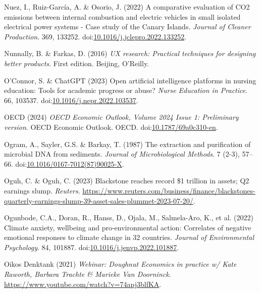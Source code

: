 \documentclass[
  letterpaper,
  DIV=11,
  numbers=noendperiod]{scrartcl}
\newlength{\cslhangindent}
\newenvironment{CSLReferences}[2] %
 {\begin{list}{}{%
  \setlength{\itemindent}{0pt}
  \setlength{\leftmargin}{0pt}
  \setlength{\parsep}{0pt}
  \ifodd #1
   \setlength{\leftmargin}{\cslhangindent}
   \setlength{\itemindent}{-1\cslhangindent}
  \fi
  \setlength{\itemsep}{#2\baselineskip}}}
 {\end{list}}
\begin{document}
\begin{CSLReferences}{0}{1}
Nuez, I., Ruiz-García, A. \& Osorio, J. (2022) A comparative evaluation
of {CO2} emissions between internal combustion and electric vehicles in
small isolated electrical power systems - {Case} study of the {Canary
Islands}. \emph{Journal of Cleaner Production}. 369, 133252.
doi:\href{https://doi.org/10.1016/j.jclepro.2022.133252}{10.1016/j.jclepro.2022.133252}.

Nunnally, B. \& Farkas, D. (2016) \emph{{UX} research: Practical
techniques for designing better products}. First edition. Beijing,
O'Reilly.

O'Connor, S. \& ChatGPT (2023) Open artificial intelligence platforms in
nursing education: {Tools} for academic progress or abuse? \emph{Nurse
Education in Practice}. 66, 103537.
doi:\href{https://doi.org/10.1016/j.nepr.2022.103537}{10.1016/j.nepr.2022.103537}.

OECD (2024) \emph{{OECD Economic Outlook}, {Volume} 2024 {Issue} 1:
{Preliminary} version}. {OECD Economic Outlook}. OECD.
doi:\href{https://doi.org/10.1787/69a0c310-en}{10.1787/69a0c310-en}.

Ogram, A., Sayler, G.S. \& Barkay, T. (1987) The extraction and
purification of microbial {DNA} from sediments. \emph{Journal of
Microbiological Methods}. 7 (2-3), 57--66.
doi:\href{https://doi.org/10.1016/0167-7012(87)90025-X}{10.1016/0167-7012(87)90025-X}.

Oguh, C. \& Oguh, C. (2023) Blackstone reaches record \$1 trillion in
assets; {Q2} earnings slump. \emph{Reuters}.
\url{https://www.reuters.com/business/finance/blackstones-quarterly-earnings-slump-39-asset-sales-plummet-2023-07-20/}.

Ogunbode, C.A., Doran, R., Hanss, D., Ojala, M., Salmela-Aro, K., et al.
(2022) Climate anxiety, wellbeing and pro-environmental action:
Correlates of negative emotional responses to climate change in 32
countries. \emph{Journal of Environmental Psychology}. 84, 101887.
doi:\href{https://doi.org/10.1016/j.jenvp.2022.101887}{10.1016/j.jenvp.2022.101887}.

Oikos Denktank (2021) \emph{Webinar: {Doughnut Economics} in practice w/
{Kate Raworth}, {Barbara Trachte} \& {Marieke Van Doorninck}}.
\url{https://www.youtube.com/watch?v=74apj3blfKA}.


\end{CSLReferences}
\end{document}
